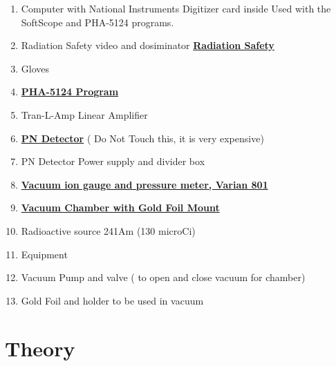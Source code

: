 \documentclass{../lab}
\begin{document}
\begin{enumerate}
    \item Computer with National Instruments Digitizer card inside Used with the SoftScope and PHA-5124 programs.

    \item Radiation Safety video and dosiminator \href{http://experimentationlab.berkeley.edu/RadiationSafety}{\textbf{Radiation Safety}}

    \item Gloves

    \item \href{http://dev-physicsadv.pantheon.berkeley.edu/PHA-5124Program}{\textbf{PHA-5124 Program}}

    \item Tran-L-Amp Linear Amplifier

    \item \href{http://physics111.lib.berkeley.edu/Physics111/Reprints/RUT/RUT\_Detector\_018.JPG}{\textbf{PN Detector}} ( Do Not Touch this, it is very expensive)

    \item PN Detector Power supply and divider box

    \item \href{http://physics111.lib.berkeley.edu/Physics111/Reprints/RUT/Thermo\_Couple\_ionGauge.pdf}{\textbf{Vacuum ion gauge and pressure meter, Varian 801}}

    \item \href{http://physics111.lib.berkeley.edu/Physics111/Reprints/RUT/RUT\_Chamber\_017.JPG}{\textbf{Vacuum Chamber with Gold Foil Mount}}

    \item Radioactive source 241Am (130 microCi)

    \item Equipment

    \item Vacuum Pump and valve ( to open and close vacuum for chamber)

    \item Gold Foil and holder to be used in vacuum

\end{enumerate}

\section{Theory}
\end{document}
